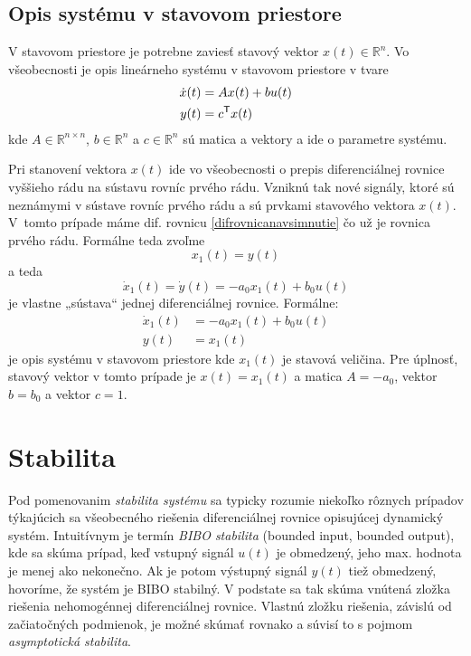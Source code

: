 \documentclass[a4paper, 10pt, ]{article}
\begin{document}
\subsection{Opis systému v stavovom priestore}

V stavovom priestore je potrebne zaviesť stavový vektor $x(t) \in \mathbb R^n$. Vo všeobecnosti je opis lineárneho systému v stavovom priestore v tvare
\begin{subequations}
\begin{align}
    \dot x(t) &= A x(t) + b u(t) \\
    y(t) &= c^{\mathsf{T}} x(t) 
\end{align}
\end{subequations}
kde $A \in \mathbb R^{n \times n}$, $b \in \mathbb R^n$ a $c \in \mathbb R^n$ sú matica a vektory a ide o parametre systému. 

Pri stanovení vektora $x(t)$ ide vo všeobecnosti o prepis diferenciálnej rovnice vyššieho rádu na sústavu rovníc prvého rádu. Vzniknú tak nové signály, ktoré sú neznámymi v sústave rovníc prvého rádu a sú prvkami stavového vektora $x(t)$. V~tomto prípade máme dif. rovnicu \eqref{difrovnicanavsimnutie} čo už je rovnica prvého rádu. Formálne teda zvoľme
\begin{equation}
    x_1(t) = y(t)
\end{equation}
a teda
\begin{equation}
    \dot x_1(t) = \dot y(t) = - a_0 x_1(t) + b_0 u(t)
\end{equation}
je vlastne „sústava“ jednej diferenciálnej rovnice. Formálne:
\begin{subequations}
\begin{align}
    \dot x_1(t) &= - a_0 x_1(t) + b_0 u(t) \\
    y(t) &= x_1(t)
\end{align}
\end{subequations}
je opis systému v stavovom priestore kde $x_1(t)$ je stavová veličina. Pre úplnosť, stavový vektor v tomto prípade je $x(t) = x_1(t)$ a matica $A = -a_0$, vektor $b = b_0$ a vektor $c = 1$.




\section{Stabilita}

Pod pomenovanim \emph{stabilita systému} sa typicky rozumie niekoľko rôznych prípadov týkajúcich sa všeobecného riešenia diferenciálnej rovnice opisujúcej dynamický systém. Intuitívnym je termín \emph{BIBO stabilita} (bounded input, bounded output), kde sa skúma prípad, keď vstupný signál $u(t)$ je obmedzený, jeho max. hodnota je menej ako nekonečno. Ak je potom výstupný signál $y(t)$ tiež obmedzený, hovoríme, že systém je BIBO stabilný. V podstate sa tak skúma vnútená zložka riešenia nehomogénnej diferenciálnej rovnice. Vlastnú zložku riešenia, závislú od začiatočných podmienok, je možné skúmať rovnako a súvisí to s pojmom \emph{asymptotická stabilita}. 
\end{document}
